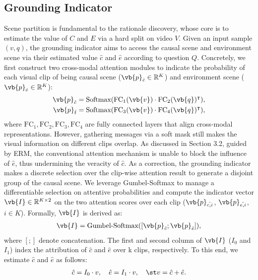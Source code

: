 \subsection{Grounding Indicator}
Scene partition is fundamental to the rationale discovery, whose core is to estimate the value of $C$ and $E$ via a hard split on video $V$. Given an input sample $(v,q)$, the grounding indicator aims to access the causal scene and environment scene via their estimated value $\hat{c}$ and $\hat{e}$ according to question $Q$. 
%
Concretely, we first construct two cross-modal attention modules to indicate the probability of each visual clip of being causal scene ($\vb{p}_{\hat{c}} \in\mathbb{R}^{K}$) 
and environment scene ($\vb{p}_{\hat{e}}\in\mathbb{R}^{K}$):
\begin{align}
    \vb{p}_{\hat{c}} &= \text{Softmax}(\text{FC}_{1}(\vb{v})\cdot\text{FC}_{2}(\vb{q})^\intercal),\\
    \vb{p}_{\hat{t}} &= \text{Softmax}(\text{FC}_{3}(\vb{v})\cdot\text{FC}_{4}(\vb{q})^\intercal),
\end{align}
where $\text{FC}_{1},\text{FC}_{2},\text{FC}_{3},\text{FC}_{4}$ are fully connected layers that align cross-modal representations.
%
However, gathering messages via a soft mask still makes the visual information on different clips overlap. 
As discussed in Section 3.2, guided by ERM, the conventional attention mechanism is unable to block the influence of $\hat{e}$, thus undermining the veracity of $\hat{c}$.
%
As a correction, the grounding indicator makes a discrete selection over the clip-wise attention result to generate a disjoint group of the causal scene. We leverage Gumbel-Softmax \cite{DBLP:conf/iclr/JangGP17} to manage a differentiable selection on attentive probabilities and compute the indicator vector $\vb{I}\in\mathbb{R}^{K\times 2}$ on the two attention scores  over each clip (\ie $\vb{p}_{\hat{c,i}}$, $\vb{p}_{\hat{e,i}}$, $i \in K$).  Formally, $\vb{I}$ is derived as:
\begin{gather}
    \vb{I} = \text{Gumbel-Softmax}([\vb{p}_{\hat{c}};\vb{p}_{\hat{e}}]), 
\end{gather}
where $[;]$ denote concatenation. The first and second column of $\vb{I}$ (\ie $I_{0}$ and $I_{1}$) index the attribution of $\hat{c}$ and $\hat{e}$ over k clips, respectively. 
%
To this end, we estimate $\hat{c}$ and $\hat{e}$ as follows:
\begin{gather}
    \hat{c} = I_{0}\cdot v ,\quad \hat{e} = I_{1}\cdot v, \quad \st v=\hat{c}+\hat{e} .
\end{gather}

